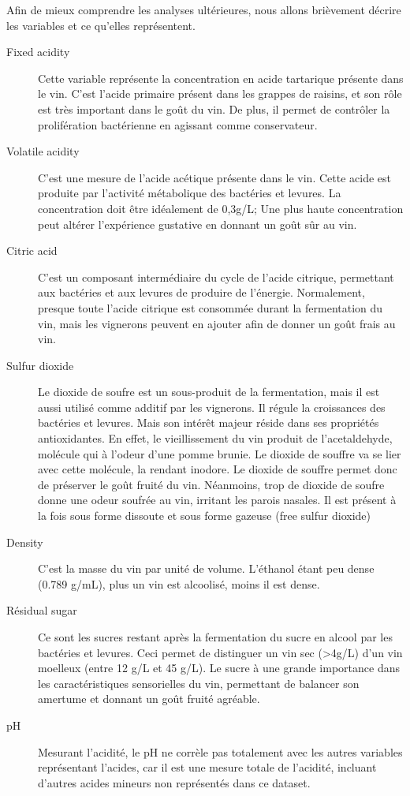 \documentclass[11pt,a4paper]{article}
\begin{document}
Afin de mieux comprendre les analyses ultérieures, nous allons brièvement décrire les variables et ce qu'elles représentent.
\begin{description}
	\item[Fixed acidity] Cette variable représente la concentration en acide tartarique présente dans le vin. C'est l'acide primaire présent dans les grappes de raisins, et son rôle est très important dans le goût du vin. De plus, il permet de contrôler la prolifération bactérienne en agissant comme conservateur.
	\item[Volatile acidity] C'est une mesure de l'acide acétique présente dans le vin. Cette acide est produite par l'activité métabolique des bactéries et levures. La concentration doit être idéalement de 0,3g/L; Une plus haute concentration peut altérer l'expérience gustative en donnant un goût sûr au vin. 
	\item[Citric acid] C'est un composant intermédiaire du cycle de l'acide citrique, permettant aux bactéries et aux levures de produire de l'énergie. Normalement, presque toute l'acide citrique est consommée durant la fermentation du vin, mais les vignerons peuvent en ajouter afin de donner un goût frais au vin. 
	\item[Sulfur dioxide] Le dioxide de soufre est un sous-produit de la fermentation, mais il est aussi utilisé comme additif par les vignerons. Il régule la croissances des bactéries et levures. Mais son intérêt majeur réside dans ses propriétés antioxidantes. En effet, le vieillissement du vin produit de l'acetaldehyde, molécule qui à l'odeur d'une pomme brunie. Le dioxide de souffre va se lier avec cette molécule, la rendant inodore. Le dioxide de souffre permet donc de préserver le goût fruité du vin. Néanmoins, trop de dioxide de soufre donne une odeur soufrée au vin, irritant les parois nasales. Il est présent à la fois sous forme dissoute et sous forme gazeuse (free sulfur dioxide)
	\item[Density] C'est la masse du vin par unité de volume. L'éthanol étant peu dense (0.789 g/mL), plus un vin est alcoolisé, moins il est dense. 
	\item[Résidual sugar] Ce sont les sucres restant après la fermentation du sucre en alcool par les bactéries et levures. Ceci permet de distinguer un vin sec (>4g/L) d'un vin moelleux (entre 12 g/L et 45 g/L). Le sucre à une grande importance dans les caractéristiques sensorielles du vin, permettant de balancer son amertume et donnant un goût fruité agréable.
	\item[pH] Mesurant l'acidité, le pH ne corrèle pas totalement avec les autres variables représentant l'acides, car il est une mesure totale de l'acidité, incluant d'autres acides mineurs non représentés dans ce dataset.

\end{description}
\end{document}
